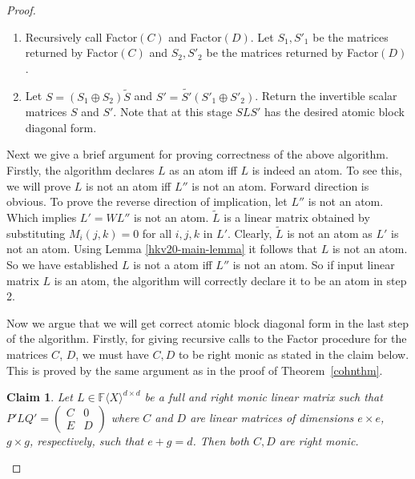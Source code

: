 \documentclass[10pt,a4paper]{article}
\newtheorem{claim}[theorem]{Claim}
\newcommand{\F}{\mathbb{F}}
\renewcommand{\angle}[1]{\langle #1 \rangle}
\newcommand{\FX}{\F\angle{X}}
\newcommand{\fR}{\FX}
\begin{document}
\begin{proof}
\begin{enumerate}
\item Recursively call Factor$(C)$ and Factor$(D)$. Let $S_1, S'_1$ be
  the matrices returned by Factor$(C)$ and $S_2, S'_2$ be the matrices
  returned by Factor$(D)$.

\item Let $S =(S_1 \oplus S_2)\tilde{S}$ and $S' = \tilde{S'}(S'_1
  \oplus S'_2)$. Return the invertible scalar matrices $S$ and
  $S'$. Note that at this stage $SLS'$ has the desired atomic block
  diagonal form.
\end{enumerate}

Next we give a brief argument for proving correctness of the above
algorithm. Firstly, the algorithm declares $L$ as an atom iff $L$ is
indeed an atom. To see this, we will prove $L$ is not an atom iff
$L''$ is not an atom. Forward direction is obvious. To prove the
reverse direction of implication, let $L''$ is not an atom. Which
implies $L' = W L''$ is not an atom. $\tilde{L}$ is a linear matrix
obtained by substituting $M_i(j,k)=0$ for all $i,j,k$ in
$L'$. Clearly, $\tilde{L}$ is not an atom as $L'$ is not an
atom. Using Lemma \ref{hkv20-main-lemma} it follows that $L$ is not an
atom. So we have established $L$ is not a atom iff $L''$ is not an
atom. So if input linear matrix $L$ is an atom, the algorithm will
correctly declare it to be an atom in step 2.

Now we argue that we will get correct atomic block diagonal form in
the last step of the algorithm. Firstly, for giving recursive calls to
the Factor procedure for the matrices $C$, $D$, we must have $C, D$ to
be right monic as stated in the claim below. This is proved by the
same argument as in the proof of Theorem~\ref{cohnthm}.

%
%

\begin{claim} \label{monic-monic}
Let $L \in \fR^{d \times d}$ be a full and right monic linear matrix
such that $P'LQ' = \left(
\begin{array}{cc}
C & 0 \\
E & D
\end{array}
\right)$ where $C$ and $D$ are linear matrices of dimensions $e \times
e$, $g \times g$, respectively, such that $e+g = d$. Then both $C, D$
are right monic.
\end{claim}


\end{proof}
\end{document}
